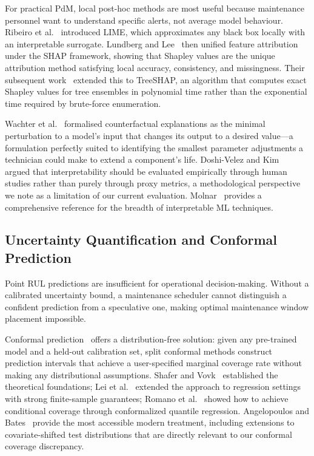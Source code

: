 \documentclass[10pt, journal, letterpaper]{IEEEtran}
\begin{document}
For practical PdM, local post-hoc methods are most useful because maintenance
personnel want to understand specific alerts, not average model behaviour.
Ribeiro et al.~\cite{ribeiro2016} introduced LIME, which approximates any
black box locally with an interpretable surrogate. Lundberg and
Lee~\cite{lundberg2017} then unified feature attribution under the SHAP
framework, showing that Shapley values are the unique attribution method
satisfying local accuracy, consistency, and missingness. Their subsequent
work~\cite{lundberg2020} extended this to TreeSHAP, an algorithm that computes
exact Shapley values for tree ensembles in polynomial time rather than the
exponential time required by brute-force enumeration.

Wachter et al.~\cite{wachter2017} formalised counterfactual explanations as
the minimal perturbation to a model's input that changes its output to a
desired value—a formulation perfectly suited to identifying the smallest
parameter adjustments a technician could make to extend a component's life.
Doshi-Velez and Kim~\cite{dosivelez2017} argued that interpretability should
be evaluated empirically through human studies rather than purely through
proxy metrics, a methodological perspective we note as a limitation of our
current evaluation. Molnar~\cite{molnar2022} provides a comprehensive reference
for the breadth of interpretable ML techniques.

\subsection{Uncertainty Quantification and Conformal Prediction}

Point RUL predictions are insufficient for operational decision-making.
Without a calibrated uncertainty bound, a maintenance scheduler cannot
distinguish a confident prediction from a speculative one, making optimal
maintenance window placement impossible.

Conformal prediction~\cite{vovk2005,vovk2008} offers a distribution-free
solution: given any pre-trained model and a held-out calibration set, split
conformal methods construct prediction intervals that achieve a user-specified
marginal coverage rate without making any distributional assumptions.
Shafer and Vovk~\cite{vovk2008} established the theoretical foundations;
Lei et al.~\cite{lei2018} extended the approach to regression settings with
strong finite-sample guarantees; Romano et al.~\cite{romano2019} showed how
to achieve conditional coverage through conformalized quantile regression.
Angelopoulos and Bates~\cite{angelopoulos2021} provide the most accessible
modern treatment, including extensions to covariate-shifted test distributions
that are directly relevant to our conformal coverage discrepancy.
\end{document}

